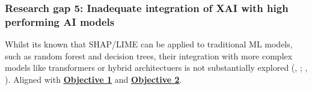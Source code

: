 
\subsubsection*{Research gap 5: Inadequate integration of XAI with high performing AI models}\label{research-gap-5}
Whilst its known that SHAP/LIME can be applied to traditional ML models, such as random forest and decision trees, their integration with more complex models like transformers or hybrid architectuers is not substantially explored (\citeauthor{alzahrani2024explainable}, \citeyear{alzahrani2024explainable}; \citeauthor{lim2025explicate}, \citeyear{lim2025explicate}). Aligned with \hyperref[objective-1]{\uline{\textbf{Objective 1}}} and \hyperref[objective-2]{\uline{\textbf{Objective 2}}}.
